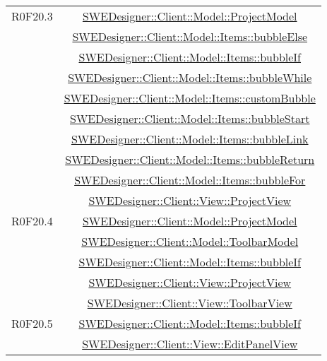 \documentclass[../DefinizioneDiProdotto.tex]{subfiles}
\begin{document}
\begin{longtable}{|c|c|}
				R0F20.3
				& \hyperlink{SWEDesigner::Client::Model::ProjectModel}{SWEDesigner::Client::Model::ProjectModel}\\
				& \hyperlink{SWEDesigner::Client::Model::Items::bubbleElse}{SWEDesigner::Client::Model::Items::bubbleElse}\\
				& \hyperlink{SWEDesigner::Client::Model::Items::bubbleIf}{SWEDesigner::Client::Model::Items::bubbleIf}\\
				& \hyperlink{SWEDesigner::Client::Model::Items::bubbleWhile}{SWEDesigner::Client::Model::Items::bubbleWhile}\\
				& \hyperlink{SWEDesigner::Client::Model::Items::customBubble}{SWEDesigner::Client::Model::Items::customBubble}\\
				& \hyperlink{SWEDesigner::Client::Model::Items::bubbleStart}{SWEDesigner::Client::Model::Items::bubbleStart}\\
				& \hyperlink{SWEDesigner::Client::Model::Items::bubbleLink}{SWEDesigner::Client::Model::Items::bubbleLink}\\
				& \hyperlink{SWEDesigner::Client::Model::Items::bubbleReturn}{SWEDesigner::Client::Model::Items::bubbleReturn}\\
				& \hyperlink{SWEDesigner::Client::Model::Items::bubbleFor}{SWEDesigner::Client::Model::Items::bubbleFor}\\
				& \hyperlink{SWEDesigner::Client::View::ProjectView}{SWEDesigner::Client::View::ProjectView}\\
				\hline

				R0F20.4
				& \hyperlink{SWEDesigner::Client::Model::ProjectModel}{SWEDesigner::Client::Model::ProjectModel}\\
				& \hyperlink{SWEDesigner::Client::Model::ToolbarModel}{SWEDesigner::Client::Model::ToolbarModel}\\
				& \hyperlink{SWEDesigner::Client::Model::Items::bubbleIf}{SWEDesigner::Client::Model::Items::bubbleIf}\\
				& \hyperlink{SWEDesigner::Client::View::ProjectView}{SWEDesigner::Client::View::ProjectView}\\
				& \hyperlink{SWEDesigner::Client::View::ToolbarView}{SWEDesigner::Client::View::ToolbarView}\\
				\hline

				R0F20.5
				& \hyperlink{SWEDesigner::Client::Model::Items::bubbleIf}{SWEDesigner::Client::Model::Items::bubbleIf}\\
				& \hyperlink{SWEDesigner::Client::View::EditPanelView}{SWEDesigner::Client::View::EditPanelView}\\
				\hline


\end{longtable}
\end{document}

